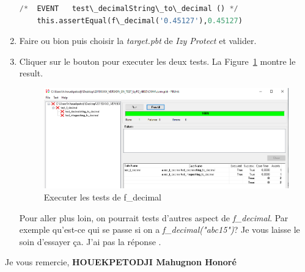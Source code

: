 \documentclass[french]{article}
\theoremstyle{definition}
\begin{document}
\begin{enumerate}
\begin{lstlisting}[language=Python, caption= f\_decimal test 2]
    /*	EVENT	test\_decimalString\_to\_decimal ()	*/
    this.assertEqual(f\_decimal('0.45127'),0.45127)
\end{lstlisting}
\item  Faire  ou bion  puis choisir la \textit{target.pbt} de \textit{Izy Protect} et valider.
\item Cliquer sur le bouton  pour executer les deux tests. La Figure~\ref{fig:testPass} montre le result. 
\begin{figure}[!htbp]
    \begin{center}
    \includegraphics[width=1\linewidth]{./uf_decimal_tests_pass.png}
    \caption{Executer les tests de f\_decimal}
    \label{fig:testPass}
    \end{center}
  \end{figure}
  Pour aller plus loin, on pourrait tests d'autres aspect de \textit{f\_decimal}. 
  Par exemple qu'est-ce qui se passe si on a \textit{f\_decimal("abc15")}?
 Je vous laisse le soin d'essayer ça.
  J'ai pas la réponse \smiley.
\end{enumerate}
  
\newpage
Je vous remercie, \textbf{HOUEKPETODJI Mahugnon Honoré}
% 
% 
\end{document}
